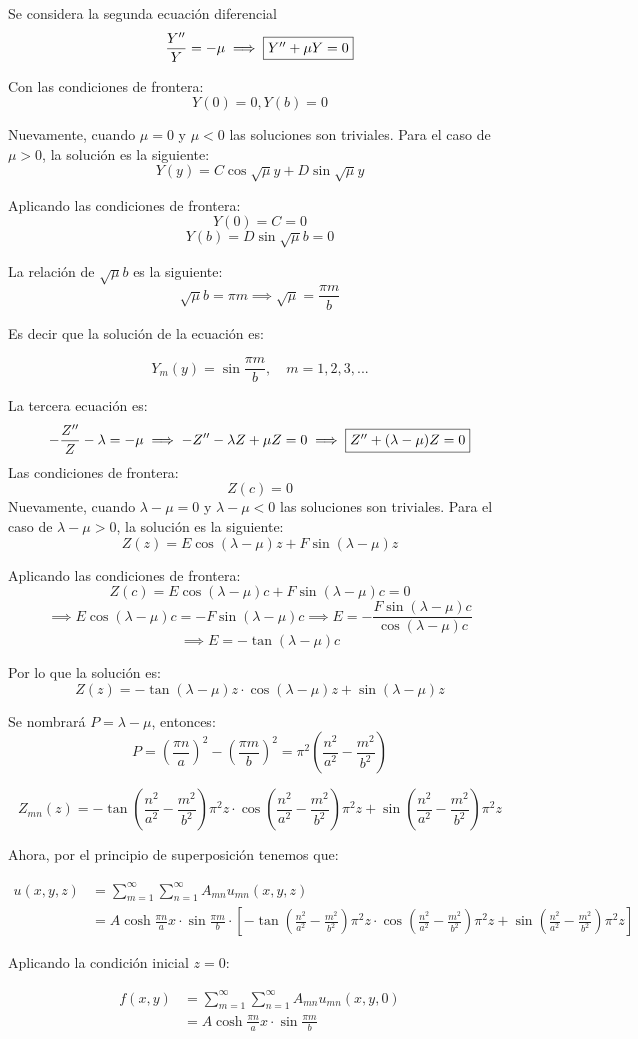 \begin{solution}
\linea 

Se considera la segunda ecuación diferencial 
$$\frac{Y''}{Y}=-\mu \implies \fbox{$Y'' +\mu Y=0$}$$

Con las condiciones de frontera: 
$$Y(0)=0, Y(b)=0$$

Nuevamente, cuando $\mu = 0$ y $\mu<0$ las soluciones son triviales. Para el caso de $\mu>0$, la solución es la siguiente: 
$$Y(y)= C\cos \sqrt{\mu}y+D\sin \sqrt{\mu}y$$

Aplicando las condiciones de frontera: 
$$Y(0)= C= 0 $$
$$Y(b)= D\sin \sqrt{\mu}b=0$$

La relación de $\sqrt{\mu}b$ es la siguiente: 
$$\sqrt{\mu}b=\pi m \implies \sqrt{\mu}=\frac{\pi m}{b}$$

Es decir que la solución de la ecuación es: 

$$Y_m(y) = \sin \frac{\pi m}{b}, \quad m=1,2,3,...$$

\linea 

La tercera ecuación es: 
$$-\frac{Z''}{Z}-\lambda =-\mu\implies -Z''-\lambda Z+\mu Z = 0 \implies \fbox{$Z''+(\lambda-\mu) Z = 0 $}$$
Las condiciones de frontera: 
$$ Z(c)=0$$
Nuevamente, cuando $\lambda-\mu = 0$ y $\lambda-\mu<0$ las soluciones son triviales. Para el caso de $\lambda-\mu>0$, la solución es la siguiente: 
$$Z(z)= E\cos(\lambda-\mu)z+F\sin (\lambda -\mu)z$$

Aplicando las condiciones de frontera: 
$$Z(c)= E\cos(\lambda-\mu)c+F\sin(\lambda-\mu)c=0$$
$$\implies E\cos(\lambda-\mu)c =-F\sin(\lambda-\mu)c\implies E=-\frac{F\sin(\lambda-\mu)c}{\cos(\lambda-\mu)c}$$
$$\implies E= - \tan(\lambda -\mu)c$$

Por lo que la solución es: 
$$Z(z)= -\tan(\lambda-\mu)z\cdot\cos(\lambda-\mu)z+\sin (\lambda -\mu)z$$


Se nombrará $P=\lambda -\mu$, entonces: 
$$P= \left(\frac{\pi n}{a}\right)^2-\left(\frac{\pi m}{b}\right)^2=\pi^2\left(\frac{n^2}{a^2}-\frac{m^2}{b^2}\right)$$

$$Z_{mn}(z)= -\tan \left(\frac{n^2}{a^2}-\frac{m^2}{b^2}\right)\pi^2z \cdot\cos \left(\frac{n^2}{a^2}-\frac{m^2}{b^2}\right)\pi^2z+\sin \left(\frac{n^2}{a^2}-\frac{m^2}{b^2}\right)\pi^2 z$$

Ahora, por el principio de superposición tenemos que:

\begin{align*}
    u(x,y,z) &= \sum_{m=1}^\infty \sum_{n=1}^\infty A_{mn}u_{mn}(x,y,z)\\ 
    &= A\cosh \frac{\pi n}{a}x\cdot \sin \frac{\pi m}{b}\cdot [-\tan \left(\frac{n^2}{a^2}-\frac{m^2}{b^2}\right)\pi^2z \cdot\cos \left(\frac{n^2}{a^2}-\frac{m^2}{b^2}\right)\pi^2z+\sin \left(\frac{n^2}{a^2}-\frac{m^2}{b^2}\right)\pi^2 z]
\end{align*}

Aplicando la condición inicial $z=0$: 

\begin{align*}
    f(x,y) &= \sum_{m=1}^\infty \sum_{n=1}^\infty A_{mn}u_{mn}(x,y,0)\\ 
    &= A\cosh \frac{\pi n}{a}x\cdot \sin \frac{\pi m}{b}
\end{align*}

\end{solution}